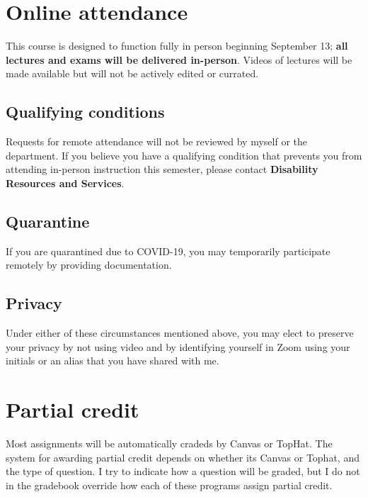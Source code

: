 \documentclass[
]{book}
\begin{document}
\hypertarget{online-attendance}{%
\chapter{Online attendance}\label{online-attendance}}

This course is designed to function fully in person beginning September 13; \textbf{all lectures and exams will be delivered in-person}. Videos of lectures will be made available but will not be actively edited or currated.

\hypertarget{qualifying-conditions}{%
\section{Qualifying conditions}\label{qualifying-conditions}}

Requests for remote attendance will not be reviewed by myself or the department. If you believe you have a qualifying condition that prevents you from attending in-person instruction this semester, please contact \textbf{Disability Resources and Services}.

\hypertarget{quarantine}{%
\section{Quarantine}\label{quarantine}}

If you are quarantined due to COVID-19, you may temporarily participate remotely by providing documentation.

\hypertarget{privacy}{%
\section{Privacy}\label{privacy}}

Under either of these circumstances mentioned above, you may elect to preserve your privacy by not using video and by identifying yourself in Zoom using your initials or an alias that you have shared with me.

\hypertarget{partial-credit}{%
\chapter{Partial credit}\label{partial-credit}}

Most assignments will be automatically cradeds by Canvas or TopHat. The system for awarding partial credit depends on whether its Canvas or Tophat, and the type of question. I try to indicate how a question will be graded, but I do not in the gradebook override how each of these programs assign partial credit.
\end{document}
